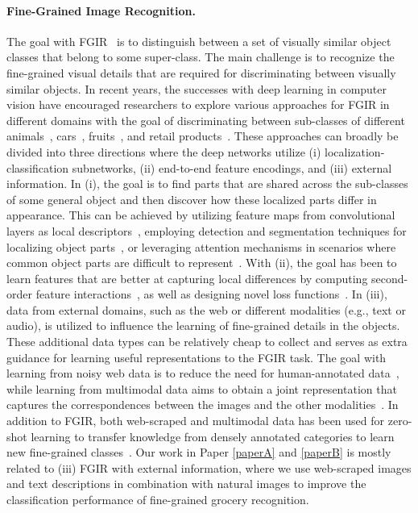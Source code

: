 \paragraph{Fine-Grained Image Recognition.} 
The goal with FGIR~\cite{wei2021fine} is to distinguish between a set of visually similar object classes that belong to some super-class. The main challenge is to recognize the fine-grained visual details that are required for discriminating between visually similar objects. In recent years, the successes with deep learning in computer vision have encouraged researchers to explore various approaches for FGIR in different domains with the goal of discriminating between sub-classes of different animals~\cite{van2018inaturalist}, cars~\cite{krause2013stanford_cars}, fruits~\cite{hou2017vegfru}, and retail products~\cite{wei2019rpc}. These approaches can broadly be divided into three directions where the deep networks utilize (i) localization-classification subnetworks, (ii) end-to-end feature encodings, and (iii) external information. 
In (i), the goal is to find parts that are shared across the sub-classes of some general object and then discover how these localized parts differ in appearance. 
This can be achieved by utilizing feature maps from convolutional layers as local descriptors~\cite{zhang2016picking, wang2018learning}, %
employing detection and segmentation techniques for localizing object parts~\cite{branson2014bird,zhang2014part,zhang2016weakly}, 
or leveraging attention mechanisms in scenarios where common object parts are difficult to represent~\cite{fu2017look,zheng2017learning}. %
With (ii), the goal has been to learn features that are better at capturing local differences by computing second-order feature interactions~\cite{lin2015bilinear,cui2017kernel}, as well as designing novel loss functions~\cite{dubey2018pairwise,chang2020devil}. %
In (iii), data from external domains, such as the web or different modalities (e.g., text or audio), is utilized to influence the learning of fine-grained details in the objects. These additional data types can be relatively cheap to collect and serves as extra guidance for learning useful representations to the FGIR task. The goal with learning from noisy web data is to reduce the need for human-annotated data~\cite{krause2016unreasonable,xu2016webly,sun2019learning}, while learning from multimodal data aims to obtain a joint representation that captures the correspondences between the images and the other modalities~\cite{he2017fine,zhang2018audio,chen2018knowledge}. In addition to FGIR, both web-scraped and multimodal data has been used for zero-shot learning to transfer knowledge from densely annotated categories to learn new fine-grained classes~\cite{reed2016learning,niu2018webly,akata2015evaluation}. Our work in Paper \ref{paperA} and \ref{paperB} is mostly related to (iii) FGIR with external information, where we use web-scraped images and text descriptions in combination with natural images to improve the classification performance of fine-grained grocery recognition.


